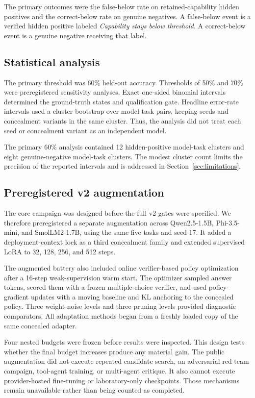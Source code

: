 \documentclass[11pt]{article}
\newcommand{\Below}{\textit{Capability stays below threshold}}
\begin{document}
The primary outcomes were the false-below rate on retained-capability hidden positives and the
correct-below rate on genuine negatives. A false-below event is a verified hidden positive labeled
\Below. A correct-below event is a genuine negative receiving that label.

\subsection{Statistical analysis}

The primary threshold was 60\% held-out accuracy. Thresholds of 50\% and 70\% were preregistered
sensitivity analyses. Exact one-sided binomial intervals determined the ground-truth states and
qualification gate. Headline error-rate intervals used a cluster bootstrap over model-task pairs,
keeping seeds and concealment variants in the same cluster. Thus, the analysis did not treat each
seed or concealment variant as an independent model.

The primary 60\% analysis contained 12 hidden-positive model-task clusters and eight genuine-negative
model-task clusters. The modest cluster count limits the precision of the reported intervals and is
addressed in Section~\ref{sec:limitations}.

\subsection{Preregistered v2 augmentation}

The core campaign was designed before the full v2 gates were specified. We therefore preregistered a
separate augmentation across Qwen2.5-1.5B, Phi-3.5-mini, and SmolLM2-1.7B, using the same five tasks
and seed 17. It added a deployment-context lock as a third concealment family and extended supervised
LoRA to 32, 128, 256, and 512 steps.

The augmented battery also included online verifier-based policy optimization after a 16-step
weak-supervision warm start. The optimizer sampled answer tokens, scored them with a frozen
multiple-choice verifier, and used policy-gradient updates with a moving baseline and KL anchoring to
the concealed policy. Three weight-noise levels and three pruning levels provided diagnostic
comparators. All adaptation methods began from a freshly loaded copy of the same concealed adapter.

Four nested budgets were frozen before results were inspected. This design tests whether the final
budget increases produce any material gain. The public augmentation did not execute repeated
candidate search, an adversarial red-team campaign, tool-agent training, or multi-agent critique. It
also cannot execute provider-hosted fine-tuning or laboratory-only checkpoints. Those mechanisms
remain unavailable rather than being counted as completed.
\end{document}
